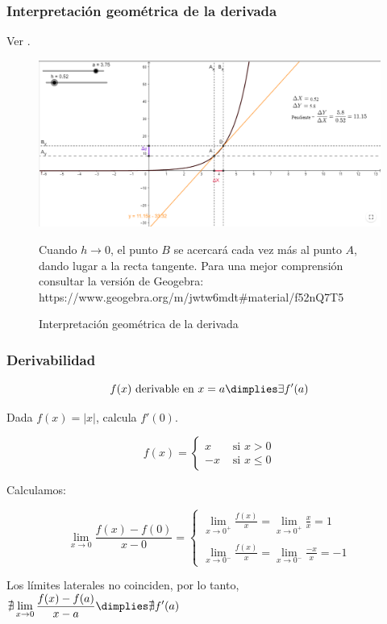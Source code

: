 \subsubsection{Interpretación geométrica de la derivada}

Ver .

\begin{figure}[hbp]
\centering
\includegraphics[scale=0.5]{img/DerivadaInterGeometrica}
\label{fig::funinterpretacionderivadapunto}
\caption{Interpretación geométrica de la derivada} Cuando $h\to0$, el punto $B$ se acercará cada vez más al punto $A$, dando lugar a la recta tangente. 
%
Para una mejor comprensión consultar la versión de Geogebra: https://www.geogebra.org/m/jwtw6mdt\#material/f52nQ7T5

\end{figure} 



\subsubsection{Derivabilidad}
\begin{defn}
\[f(x) \text{ derivable en } x=a\dimplies \exists f'(a)\]
\end{defn}


\begin{example}
Dada $f(x) = |x|$, calcula $f'(0)$.

\[
f(x) = \begin{cases}x&\text{ si } x>0 \\ -x & \text{ si }x\leq 0\end{cases}
\]

Calculamos:

\[
\lim_{x\to 0}\frac{f(x)-f(0)}{x-0} = \begin{cases}
\displaystyle\lim_{x\to 0^+} \frac{f(x)}{x} = \displaystyle\lim_{x\to 0^+} \frac{x}{x} = 1\\\\
\displaystyle\lim_{x\to 0^-} \frac{f(x)}{x} = \displaystyle\lim_{x\to 0^-} \frac{-x}{x} = -1
\end{cases}
\]

\label{derivEjemplo}

Los límites laterales no coinciden, por lo tanto, $\nexists \displaystyle\lim_{x\to 0}\frac{f(x)-f(a)}{x-a} \dimplies \nexists f'(a)$
\end{example}



